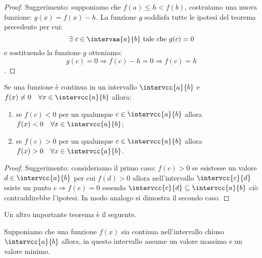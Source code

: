 \begin{proof}
Suggerimento: 
supponiamo che \(f(a) \leqslant h < f(b)\), 
costruiamo una nuova funzione: \(g(x)=f(x)-h\).
La funzione \(g\) soddisfa tutte le ipotesi del teorema precedente per cui:
\[\exists~c \in \intervaa{a}{b} \text{ tale che } g(c)=0\]
e sostituendo la funzione \(g\) otteniamo:
\[g(c)=0 \Rightarrow f(c)-h=0 \Rightarrow f(c)=h\].
\end{proof}

\begin{corollario}
Se una funzione è continua in un
intervallo \(\intervcc{a}{b}\) e 
\(f(x)\neq 0 \quad \forall x \in \intervcc{a}{b}\) 
allora:
\begin{enumerate}[nosep]
 \item se \(f(c)<0\) per un qualunque \(c \in \intervcc{a}{b}\)
 allora \(f(x)<0 \quad \forall x \in \intervcc{a}{b}\);
 \item se \(f(c)>0\) per un qualunque \(c \in \intervcc{a}{b}\)
 allora \(f(x)>0 \quad \forall x \in \intervcc{a}{b}\).
\end{enumerate}
\end{corollario}

\begin{proof}
Suggerimento: 
consideriamo il primo caso: \(f(c)>0\) 
se esistesse un valore \(d \in \intervcc{a}{b}\) per cui
\(f(d)>0\) allora nell'intervallo \(\intervcc{c}{d}\) 
esiste un punto \(e \Rightarrow f(e)=0\)
essendo \(\intervcc{c}{d} \subseteq \intervcc{a}{b}\) 
ciò contraddirebbe l'ipotesi.
In modo analogo si dimostra il secondo caso.
\end{proof}

Un altro importante teorema è il seguente.

\begin{teorema}
Supponiamo che una funzione \(f(x)\) sia continua nell'intervallo chiuso
\(\intervcc{a}{b}\) allora, in questo intervallo assume un valore massimo e un 
valore minimo.
\end{teorema}


